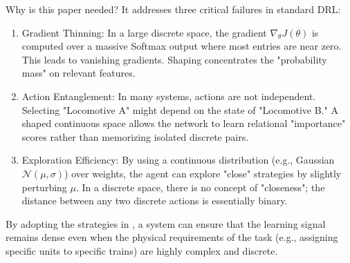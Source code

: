 \documentclass[a4paper]{scrartcl}
\begin{document}
Why is this paper needed? It addresses three critical failures in standard DRL:
\begin{enumerate}
    \item Gradient Thinning: In a large discrete space, the gradient $\nabla_{\theta} J(\theta)$ is computed over a massive Softmax output where most entries are near zero. This leads to vanishing gradients. Shaping concentrates the "probability mass" on relevant features.
    \item Action Entanglement: In many systems, actions are not independent. Selecting "Locomotive A" might depend on the state of "Locomotive B." A shaped continuous space allows the network to learn relational "importance" scores rather than memorizing isolated discrete pairs.
    \item Exploration Efficiency: By using a continuous distribution (e.g., Gaussian $\mathcal{N}(\mu, \sigma)$) over weights, the agent can explore "close" strategies by slightly perturbing $\mu$. In a discrete space, there is no concept of "closeness"; the distance between any two discrete actions is essentially binary.
\end{enumerate}

By adopting the strategies in \cite{Kanervisto2020}, a system can ensure that the learning signal remains dense even when the physical requirements of the task (e.g., assigning specific units to specific trains) are highly complex and discrete.
\end{document}
